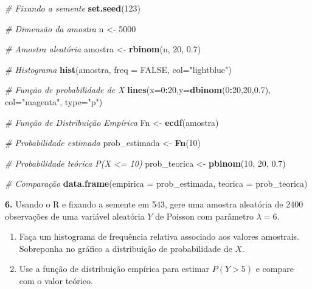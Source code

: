 \documentclass[
]{book}
\newenvironment{Shaded}{\begin{snugshade}}{\end{snugshade}}
\newcommand{\AttributeTok}[1]{\textcolor[rgb]{0.13,0.29,0.53}{#1}}
\newcommand{\CommentTok}[1]{\textcolor[rgb]{0.56,0.35,0.01}{\textit{#1}}}
\newcommand{\ConstantTok}[1]{\textcolor[rgb]{0.56,0.35,0.01}{#1}}
\newcommand{\DecValTok}[1]{\textcolor[rgb]{0.00,0.00,0.81}{#1}}
\newcommand{\FloatTok}[1]{\textcolor[rgb]{0.00,0.00,0.81}{#1}}
\newcommand{\FunctionTok}[1]{\textcolor[rgb]{0.13,0.29,0.53}{\textbf{#1}}}
\newcommand{\NormalTok}[1]{#1}
\newcommand{\OtherTok}[1]{\textcolor[rgb]{0.56,0.35,0.01}{#1}}
\newcommand{\SpecialCharTok}[1]{\textcolor[rgb]{0.81,0.36,0.00}{\textbf{#1}}}
\newcommand{\StringTok}[1]{\textcolor[rgb]{0.31,0.60,0.02}{#1}}
\begin{document}
\begin{Shaded}
\begin{Highlighting}[]
\CommentTok{\# Fixando a semente}
\FunctionTok{set.seed}\NormalTok{(}\DecValTok{123}\NormalTok{)}

\CommentTok{\# Dimensão da amostra}
\NormalTok{n }\OtherTok{\textless{}{-}} \DecValTok{5000}

\CommentTok{\# Amostra aleatória}
\NormalTok{amostra }\OtherTok{\textless{}{-}} \FunctionTok{rbinom}\NormalTok{(n, }\DecValTok{20}\NormalTok{, }\FloatTok{0.7}\NormalTok{)}

\CommentTok{\# Histograma}
\FunctionTok{hist}\NormalTok{(amostra, }\AttributeTok{freq =} \ConstantTok{FALSE}\NormalTok{, }\AttributeTok{col=}\StringTok{"lightblue"}\NormalTok{)}

\CommentTok{\# Função de probabilidade de X}
\FunctionTok{lines}\NormalTok{(}\AttributeTok{x=}\DecValTok{0}\SpecialCharTok{:}\DecValTok{20}\NormalTok{,}\AttributeTok{y=}\FunctionTok{dbinom}\NormalTok{(}\DecValTok{0}\SpecialCharTok{:}\DecValTok{20}\NormalTok{,}\DecValTok{20}\NormalTok{,}\FloatTok{0.7}\NormalTok{), }\AttributeTok{col=}\StringTok{"magenta"}\NormalTok{, }\AttributeTok{type=}\StringTok{"p"}\NormalTok{)}

\CommentTok{\# Função de Distribuição Empírica}
\NormalTok{Fn }\OtherTok{\textless{}{-}} \FunctionTok{ecdf}\NormalTok{(amostra)}

\CommentTok{\# Probabilidade estimada}
\NormalTok{prob\_estimada }\OtherTok{\textless{}{-}} \FunctionTok{Fn}\NormalTok{(}\DecValTok{10}\NormalTok{)}

\CommentTok{\# Probabilidade teórica P(X \textless{}= 10)}
\NormalTok{prob\_teorica }\OtherTok{\textless{}{-}} \FunctionTok{pbinom}\NormalTok{(}\DecValTok{10}\NormalTok{, }\DecValTok{20}\NormalTok{, }\FloatTok{0.7}\NormalTok{)}

\CommentTok{\# Comparação}
\FunctionTok{data.frame}\NormalTok{(}\AttributeTok{empirica =}\NormalTok{ prob\_estimada, }\AttributeTok{teorica =}\NormalTok{ prob\_teorica)}
\end{Highlighting}
\end{Shaded}

\textbf{6.} Usando o R e fixando a semente em 543, gere uma amostra aleatória
de 2400 observações de uma variável aleatória \(Y\) de Poisson com
parâmetro \(\lambda = 6\).

\begin{enumerate}
\def\labelenumi{(\alph{enumi})}
\item
  Faça um histograma de frequência relativa associado aos valores
  amostrais. Sobreponha no gráfico a distribuição de probabilidade de \(X\).
\item
  Use a função de distribuição empírica para estimar \(P(Y > 5)\) e
  compare com o valor teórico.
\end{enumerate}
\end{document}
